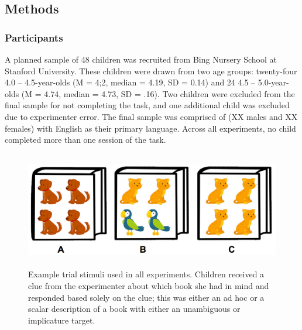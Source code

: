 \documentclass[man]{apa2}
\begin{document}
\subsection{Methods}

\subsubsection{Participants} A planned sample of 48 children was recruited from Bing Nursery School at Stanford University. These children were drawn from two age groups: twenty-four 4.0 -- 4.5-year-olds (M = 4;2, median = 4.19, SD = 0.14) and 24 4.5 -- 5.0-year-olds (M = 4.74, median = 4.73, SD = .16). Two children were excluded from the final sample for not completing the task, and one additional child was excluded due to experimenter error. The final sample was comprised of (XX males and XX females) with English as their primary language. Across all experiments, no child completed more than one session of the task. 

\begin{figure} 
 \begin{center} 
  \includegraphics[height=2in]{figures/implicatures_demo_letters.png} 
  \caption{\label{fig:demo} Example trial stimuli used in all experiments. Children received a clue from the experimenter about which book she had in mind and responded based solely on the clue; this was either an ad hoc or a scalar description of a book with either an unambiguous or implicature target.} 
 \end{center} 
\end{figure}	 
\end{document}
